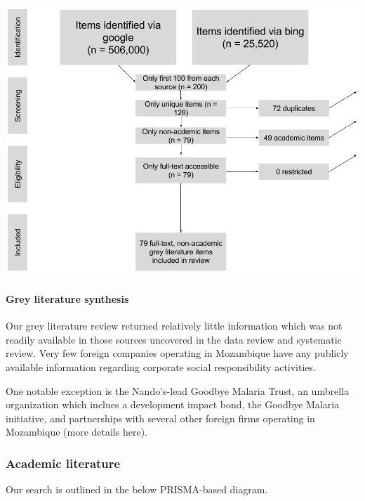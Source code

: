 \documentclass[]{elsarticle} %
\begin{document}
\begin{center}
\includegraphics[width=400pt]{img/prisma_grey.png}
\end{center}

\paragraph{Grey literature synthesis}\label{grey-literature-synthesis}

Our grey literature review returned relatively little information which
was not readily available in those sources uncovered in the data review
and systematic review. Very few foreign companies operating in
Mozambique have any publicly available information regarding corporate
social responsibility activities.

One notable exception is the Nando's-lead Goodbye Malaria Trust, an
umbrella organization which inclues a development impact bond, the
Goodbye Malaria initiative, and partnerships with several other foreign
firms operating in Mozambique (more details here).

\subsubsection{Academic literature}\label{academic-literature-1}

Our search is outlined in the below PRISMA-based diagram.
\end{document}
